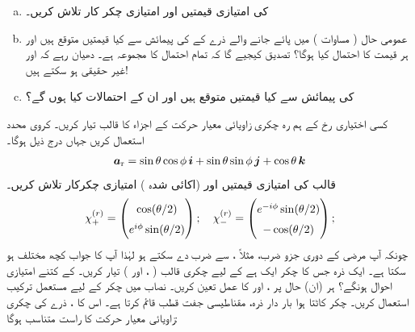  \begin{enumerate}[a.]
\item
  کی  امتیازی قیمتیں اور امتیازی چکر کار تلاش کریں۔
\item
 عمومی حال ( مساوات ) میں پائے جانے والے ذرے کے  کی پیمائش سے کیا قیمتیں متوقع ہیں اور ہر قیمت کا احتمال کیا ہوگا؟ تصدیق کیجیے گا کہ تمام احتمال کا مجموعہ  ہے۔ دھیان رہے کہ  اور  غیر حقیقی ہو سکتے ہیں! 
\item
  کی پیمائش سے کیا قیمتیں متوقع ہیں اور ان کے احتمالات کیا ہوں گے؟ 
\end{enumerate}
کسی اختیاری رخ  کے ہم رہ چکری زاویائی معیار حرکت کے اجزاء کا قالب  تیار کریں۔ کروی محدد استعمال کریں جہاں درج ذیل ہوگا۔
\begin{align}
{\boldsymbol{a}}_{\textup{r}}= \sin\theta \cos\phi\, {\boldsymbol{i}} + \sin\theta \sin\phi \, {\boldsymbol{j}} + \cos\theta \, {\boldsymbol{k}}
\end{align}
 قالب  کی امتیازی قیمتیں اور (اکائی شدہ ) امتیازی چکرکار تلاش کریں۔ 
\begin{align}
\renewcommand{\arraystretch}{1.5}
\chi_{+}^{(r)} = \begin{pmatrix} \cos(\theta/2)\\ e^{i\phi}\sin(\theta/2)\end{pmatrix};
\quad
\chi_{-}^{(r)} = \begin{pmatrix} e^{-i\phi}\sin(\theta/2)\\ -\cos(\theta/2)\end{pmatrix};
\end{align}
چونکہ آپ مرضی کے دوری جزو ضرب، مثلاً ، سے ضرب دے سکتے ہو لہٰذا آپ کا جواب کچھ مختلف ہو سکتا ہے۔ 
ایک ذرہ جس کا چکر ایک  ہے کے لیے چکری قالب ( ،  اور ) تیار کریں۔  
کے کتنے امتیازی احوال ہونگے؟ ہر (ان) حال پر ،  اور  کا عمل تعین کریں۔ نصاب میں  چکر کے لیے مستعمل ترکیب استعمال کریں۔
 چکر کاٹتا ہوا بار دار ذرہ، مقناطیسی جفت قطب قائم کرتا ہے۔ اس کا  ، ذرے کی چکری زاویائی معیار حرکت  کا راست متناسب ہوگا:
